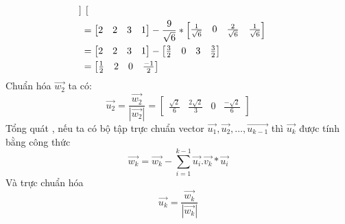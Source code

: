 \begin{itemize}
\begin{align}
\begin{bmatrix}
   \end{bmatrix}\notag\\
   & = \begin{bmatrix} 2 & 2 & 3 & 1 \end{bmatrix} - \frac{9}{\sqrt{6}} *
   \begin{bmatrix} \frac{1}{\sqrt{6}} & 0 & \frac{2}{\sqrt{6}} & \frac{1}{\sqrt{6}}
   \end{bmatrix} \notag\\ &= 
    \begin{bmatrix} 2 & 2 & 3 & 1 \end{bmatrix} -
    \begin{bmatrix} \frac{3}{2} & 0 & 3 & \frac{3}{2} 
   \end{bmatrix}\notag\\
   & = \begin{bmatrix} \frac{1}{2} & 2 & 0 & \frac{-1}{2} \end{bmatrix}\notag
   \end{align}
   Chuẩn hóa $\overrightarrow{w_2}$ ta có:
   \[ \overrightarrow{u_2} = \frac{\overrightarrow{w
  _2}}{|\overrightarrow{w_2}|} =
   \begin{bmatrix} \frac{\sqrt{2}}{6} & \frac{2\sqrt{2}}{3} & 0
   & \frac{-\sqrt{2}}{6} \end{bmatrix} \]
   Tổng quát , nếu ta có bộ tập trực chuẩn vector $\overrightarrow{u_1},
   \overrightarrow{u_2}, \dots, \overrightarrow{u_{k-1}}$ thì
   $\overrightarrow{u_k}$ được tính bằng công thức
   \[ \overrightarrow{w_k} = \overrightarrow{w_k} - \sum_{i=1}^{k-1}
   \overrightarrow{u_i}.\overrightarrow{v_k}*\overrightarrow{u_i} \]
   Và trực chuẩn hóa 
   \[ \overrightarrow{u_k} = \frac{\overrightarrow{w
  _k}}{|\overrightarrow{w_k}|} \]
\end{itemize}

